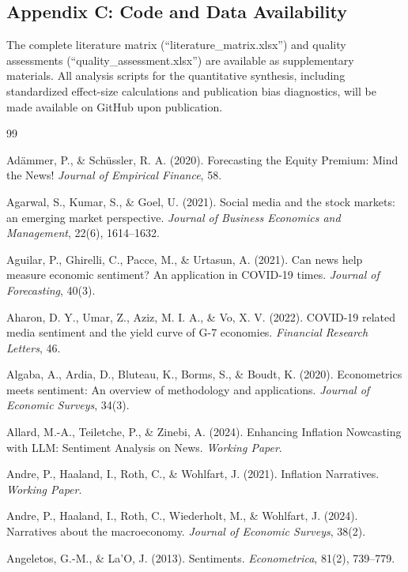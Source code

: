 \documentclass[12pt,oneside]{article}
\begin{document}
\subsection*{Appendix C: Code and Data Availability}

The complete literature matrix (``literature\_matrix.xlsx'') and quality assessments (``quality\_assessment.xlsx'') are available as supplementary materials. All analysis scripts for the quantitative synthesis, including standardized effect-size calculations and publication bias diagnostics, will be made available on GitHub upon publication.

\begin{thebibliography}{99}

 Adämmer, P., \& Schüssler, R. A. (2020). Forecasting the Equity Premium: Mind the News! \textit{Journal of Empirical Finance}, 58.

 Agarwal, S., Kumar, S., \& Goel, U. (2021). Social media and the stock markets: an emerging market perspective. \textit{Journal of Business Economics and Management}, 22(6), 1614--1632.

 Aguilar, P., Ghirelli, C., Pacce, M., \& Urtasun, A. (2021). Can news help measure economic sentiment? An application in COVID-19 times. \textit{Journal of Forecasting}, 40(3).

 Aharon, D. Y., Umar, Z., Aziz, M. I. A., \& Vo, X. V. (2022). COVID-19 related media sentiment and the yield curve of G-7 economies. \textit{Financial Research Letters}, 46.

 Algaba, A., Ardia, D., Bluteau, K., Borms, S., \& Boudt, K. (2020). Econometrics meets sentiment: An overview of methodology and applications. \textit{Journal of Economic Surveys}, 34(3).

 Allard, M.-A., Teiletche, P., \& Zinebi, A. (2024). Enhancing Inflation Nowcasting with LLM: Sentiment Analysis on News. \textit{Working Paper}.

 Andre, P., Haaland, I., Roth, C., \& Wohlfart, J. (2021). Inflation Narratives. \textit{Working Paper}.

 Andre, P., Haaland, I., Roth, C., Wiederholt, M., \& Wohlfart, J. (2024). Narratives about the macroeconomy. \textit{Journal of Economic Surveys}, 38(2).

 Angeletos, G.-M., \& La'O, J. (2013). Sentiments. \textit{Econometrica}, 81(2), 739--779.


\end{thebibliography}
\end{document}
